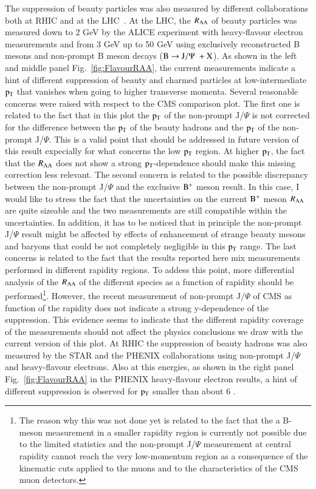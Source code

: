 \documentclass{webofc}
\begin{document}
The suppression of beauty particles was also measured by different collaborations both at RHIC and at the LHC~\cite{BAA1,BAA2,BAA3,BAA4,BAA5}. At the LHC, the $R_{\mathrm{AA}}$ of beauty 
particles was measured down to 2 GeV by the ALICE experiment with heavy-flavour electron measurements and from 3 GeV up to 50 GeV 
using exclusively reconstructed B mesons and non-prompt B meson decays ($\rm B \rightarrow J/\Psi \hspace{0.1cm}+ X$). As shown in the left and middle panel Fig.~\ref{fig:FlavourRAA}, 
the current measurements indicate a hint of different suppression of beauty and charmed particles at low-intermediate $\rm p_{\rm T} $ that vanishes when 
going to higher transverse momenta. Several reasonable concerns were raised with respect to the CMS comparison plot. 
The first one is related to the fact that in this plot the $\rm p_{\rm T} $ of the non-prompt J/$\Psi$ is not corrected for the difference between the $\rm p_{\rm T} $ of the beauty 
hadrons and the $\rm p_{\rm T} $ of the non-prompt J/$\Psi$. This is a valid point that should be addressed in future version of this result expecially for 
what concerns the low $\rm p_{\rm T} $ region. At higher $\rm p_{\rm T} $, the fact that the $R_{\mathrm{AA}}$ does not show a strong $\rm p_{\rm T} $-dependence should make this 
missing correction less relevant. The second concern is related to the possible discrepancy between the non-prompt J/$\Psi$  and the exclusive $\rm B^{+}$ meson result. 
In this case, I would like to stress the fact that the uncertainties on the current $\rm B^{+}$ meson $R_{\mathrm{AA}}$ are quite sizeable and the two measurements are still compatible 
within the uncertainties. In addition, it has to be noticed that in principle the non-prompt J/$\Psi$ result might be affected by effects of enhancement of strange beauty mesons 
and baryons that could be not completely negligible in this $\rm p_{\rm T} $ range. The last concerns is related to the fact that the results reported here mix measurements 
performed in different rapidity regions. To addess this point, more differential analysis of the $R_{\mathrm{AA}}$ of the different species as a function of rapidity 
should be performed\footnote{The reason why this was not done yet
is related to the fact that the a B-meson measurement in a smaller rapidity region is currently not possible due to the limited statistics and the non-prompt J/$\Psi$ measurement at central rapidity cannot 
reach the very low-momentum region as a consequence of the kinematic cuts applied to the muons and to the characteristics of the CMS muon detectors.}. 
However, the recent measurement of non-prompt J/$\Psi$ of CMS as function of the rapidity does not indicate a strong y-dependence of the suppression. This evidence
seems to indicate that the different rapidity coverage of the measurements should not affect the physics conclusions we draw with the current version of this plot. 
At RHIC the suppression of beauty hadrons was also measured by the STAR and the PHENIX collaborations using non-prompt J/$\Psi$  and heavy-flavour electrons. Also at this energies, 
as shown in the right panel Fig.~\ref{fig:FlavourRAA} in the PHENIX heavy-flavour electron results, a hint of different suppression is observed for $\rm p_{\rm T} $ smaller than about 6 \GeVc.
\end{document}
